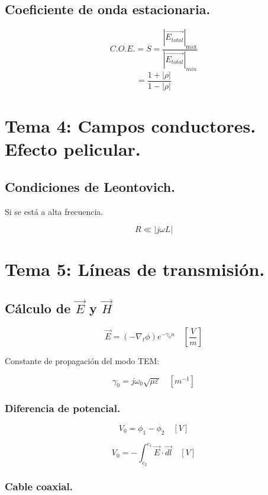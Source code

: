\documentclass[12pt,a4paper]{article}
\begin{document}
\subsection{Coeficiente de onda estacionaria.}
\label{sub:coeficiente_de_onda_estacionaria}

\[ C.O.E. = S = \frac{\left| \vec{E_{total}} \right|_{\max}}{\left|
\vec{E_{total}} \right|_{min}} \]
\[ = \frac{1+|\rho|}{1-|\rho|}  \]

\section{Tema 4: Campos conductores. Efecto pelicular.}

\subsection{Condiciones de Leontovich.}
\label{sub:condiciones_de_leontovich}

Si se está a alta frecuencia.

\[ R \ll |j \omega  L| \]

\section{Tema 5: Líneas de transmisión.}
\label{sec:lineas_de_transmision}

\subsection{Cálculo de $ \vec{E} $ y $ \vec{H} $}
\label{sub:calculo_de_E_y_H}

\[ \vec{E} = (- \nabla_t \phi) e^{- \gamma_0 n} \quad \left[ \frac{V}{m} \right] \]

Constante de propagación del modo TEM:

\[ \gamma_0 = j \omega_0 \sqrt{\mu \varepsilon} \quad [m^{-1}] \]

\subsubsection{Diferencia de potencial.}
\label{ssub:diferencia_de_potencial}

\[ V_0 = \phi_1 - \phi_2 \quad [V] \]

\[V_0 = - \int_{c_{2}}^{c_{1}} \vec{E} \cdot \vec{dl} \quad [V] \]

\subsubsection{Cable coaxial.}
\label{ssub:cable_coaxial}
\end{document}
